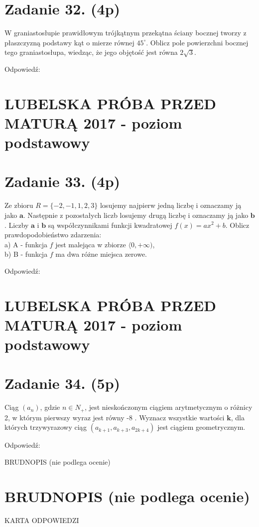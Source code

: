 \documentclass[10pt]{article}
\begin{document}
\section*{Zadanie 32. (4p)}
W graniastosłupie prawidłowym trójkątnym przekątna ściany bocznej tworzy z płaszczyzną podstawy kąt o mierze równej \(45^{\circ}\). Oblicz pole powierzchni bocznej tego graniastosłupa, wiedząc, że jego objętość jest równa \(2 \sqrt{3}\).

Odpowiedź:

\section*{LUBELSKA PRÓBA PRZED MATURĄ 2017 - poziom podstawowy}
\section*{Zadanie 33. (4p)}
Ze zbioru \(R=\{-2,-1,1,2,3\}\) losujemy najpierw jedną liczbę i oznaczamy ją jako \(\boldsymbol{a}\). Następnie z pozostałych liczb losujemy drugą liczbę i oznaczamy ją jako \(\boldsymbol{b}\). Liczby \(\boldsymbol{a}\) i \(\boldsymbol{b}\) są współczynnikami funkcji kwadratowej \(f(x)=a x^{2}+b\). Oblicz prawdopodobieństwo zdarzenia:\\
a) A - funkcja \(f\) jest malejąca w zbiorze \(\langle 0,+\infty)\),\\
b) B - funkcja \(f\) ma dwa różne miejsca zerowe.

Odpowiedź:

\section*{LUBELSKA PRÓBA PRZED MATURĄ 2017 - poziom podstawowy}
\section*{Zadanie 34. (5p)}
Ciąg \(\left(a_{n}\right)\), gdzie \(n \in N_{+}\), jest nieskończonym ciągiem arytmetycznym o różnicy 2, w którym pierwszy wyraz jest równy -8 . Wyznacz wszystkie wartości \(\boldsymbol{k}\), dla których trzywyrazowy ciąg \(\left(a_{k+1}, a_{k+3}, a_{2 k+4}\right)\) jest ciągiem geometrycznym.

Odpowiedź:

BRUDNOPIS (nie podlega ocenie)

\section*{BRUDNOPIS (nie podlega ocenie)}
KARTA ODPOWIEDZI
\end{document}
